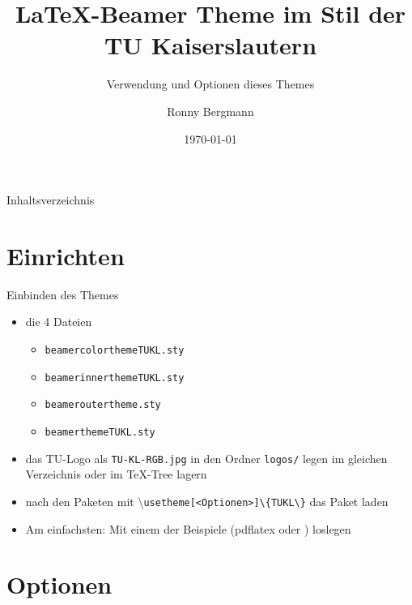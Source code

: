 \documentclass[german,10pt,xcolor=colortbl,compress
]{beamer}
\title{\LaTeX-Beamer Theme im Stil der TU Kaiserslautern}
\subtitle{Verwendung und Optionen dieses Themes}
\date[]{\today}
\author[R. Bergmann]{Ronny Bergmann}
\institute[]{AG Bildverarbeitung\\FB Mathematik\\TU Kaiserslautern}
\begin{document}
	\maketitle
	\begin{frame}{Inhaltsverzeichnis}
		\tableofcontents
	\end{frame}
	\section{Einrichten}
	\begin{frame}{Einbinden des Themes}
		\begin{itemize}
			\item die 4 Dateien
			\begin{itemize}
				\item \lstinline|beamercolorthemeTUKL.sty|
				\item \lstinline|beamerinnerthemeTUKL.sty|
				\item \lstinline!beameroutertheme.sty!
				\item \lstinline|beamerthemeTUKL.sty| 
			\end{itemize}
			\item das TU-Logo als \lstinline!TU-KL-RGB.jpg! in den Ordner \lstinline!logos/! legen
			 im gleichen Verzeichnis oder im \TeX-Tree lagern
			\item nach den Paketen mit \textbackslash\lstinline|usetheme[<Optionen>]\{TUKL\}| das Paket laden
			\item Am einfachsten: Mit einem der Beispiele (pdflatex oder \XeLaTeX) loslegen
		\end{itemize}
	\end{frame}
	\section{Optionen}
\end{document}
